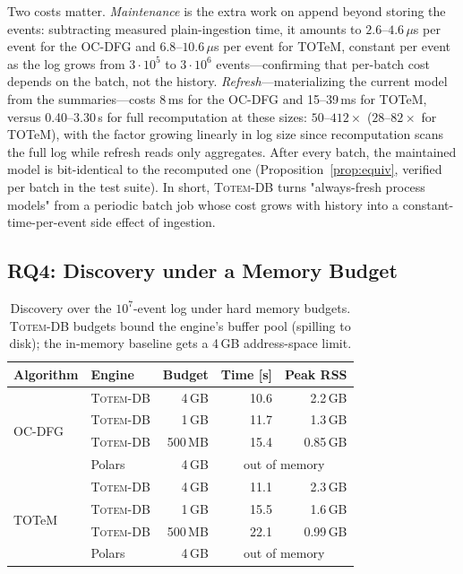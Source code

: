 \documentclass[sigconf, nonacm]{acmart}
\newcommand{\sys}{\textsc{Totem-DB}\xspace}
\begin{document}
Two costs matter. \emph{Maintenance} is the extra work on append beyond storing the events: subtracting measured plain-ingestion time, it amounts to $2.6$--$4.6\,\mu$s per event for the OC-DFG and $6.8$--$10.6\,\mu$s per event for TOTeM, constant per event as the log grows from $3{\cdot}10^5$ to $3{\cdot}10^6$ events---confirming that per-batch cost depends on the batch, not the history. \emph{Refresh}---materializing the current model from the summaries---costs 8\,ms for the OC-DFG and 15--39\,ms for TOTeM, versus 0.40--3.30\,s for full recomputation at these sizes: $50$--$412\times$ ($28$--$82\times$ for TOTeM), with the factor growing linearly in log size since recomputation scans the full log while refresh reads only aggregates. After every batch, the maintained model is bit-identical to the recomputed one (Proposition~\ref{prop:equiv}, verified per batch in the test suite). In short, \sys turns "always-fresh process models" from a periodic batch job whose cost grows with history into a constant-time-per-event side effect of ingestion.
\subsection{RQ4: Discovery under a Memory Budget}
\label{sec:eval-mem}

\begin{table}
\caption{Discovery over the $10^7$-event log under hard memory budgets. \sys budgets bound the engine's buffer pool (spilling to disk); the in-memory baseline gets a 4\,GB address-space limit.}
\label{tab:memory}
\small
\begin{tabular}{llrrr}
\toprule
Algorithm & Engine & Budget & Time [s] & Peak RSS \\
\midrule
\multirow{4}{*}{OC-DFG}
 & \sys & 4\,GB & 10.6 & 2.2\,GB \\
 & \sys & 1\,GB & 11.7 & 1.3\,GB \\
 & \sys & 500\,MB & 15.4 & 0.85\,GB \\
 & Polars & 4\,GB & \multicolumn{2}{c}{out of memory} \\
\midrule
\multirow{4}{*}{TOTeM}
 & \sys & 4\,GB & 11.1 & 2.3\,GB \\
 & \sys & 1\,GB & 15.5 & 1.6\,GB \\
 & \sys & 500\,MB & 22.1 & 0.99\,GB \\
 & Polars & 4\,GB & \multicolumn{2}{c}{out of memory} \\
\bottomrule
\end{tabular}
\end{table}
\end{document}
